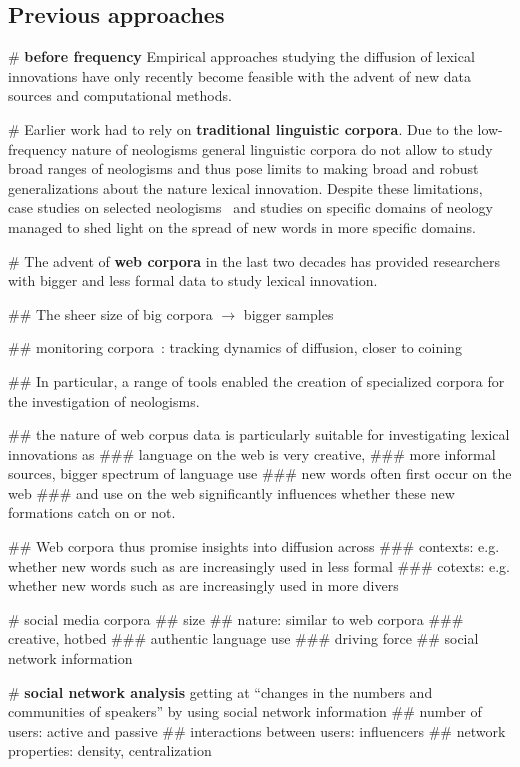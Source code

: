 \documentclass[a4paper, abstract=on]{scrartcl}
\renewcommand{\hw}[1]{\textbf{#1}}
\begin{document}
  \subsection{Previous approaches}

    \begin{easylist}[itemize]

      # \hw{before frequency} Empirical approaches studying the diffusion of lexical innovations have only recently become feasible with the advent of new data sources and computational methods.

      # Earlier work had to rely on \hw{traditional linguistic corpora}. Due to the low-frequency nature of neologisms general linguistic corpora do not allow to study broad ranges of neologisms and thus pose limits to making broad and robust generalizations about the nature lexical innovation. Despite these limitations, case studies on selected neologisms~\parencite{Hohenhaus2006} and studies on specific domains of neology~\parencite{Elsen2004} managed to shed light on the spread of new words in more specific domains.

      # The advent of \hw{web corpora} in the last two decades has provided researchers with bigger and less formal data to study lexical innovation.

        ## The sheer size of big corpora $\rightarrow$ bigger samples

        ## monitoring corpora~\parencite{Davies2013}: tracking dynamics of diffusion, closer to coining

        ## In particular, a range of tools enabled the creation of specialized corpora for the investigation of neologisms.~\parencite{Renouf2006,Kerremans2012,Lemnitzer,Gerard2017,Cartier2017}

        ## the nature of web corpus data is particularly suitable for investigating lexical innovations as
          ### language on the web is very creative,
          ### more informal sources, bigger spectrum of language use
          ### new words often first occur on the web
          ### and use on the web significantly influences whether these new formations catch on or not.

        ## Web corpora thus promise insights into diffusion across
          ### contexts: e.g. whether new words such as  are increasingly used in less formal
          ### cotexts: e.g. whether new words such as \ol{} are increasingly used in more divers

      # social media corpora \cite{Grieve2016,Eisenstein2014}
        ## size
        ## nature: similar to web corpora
          ### creative, hotbed
          ### authentic language use
          ### driving force
        ## social network information

      # \hw{social network analysis} getting at \enquote{changes in the numbers and communities of speakers} by using social network information
        ## number of users: active and passive
        ## interactions between users: influencers
        ## network properties: density, centralization

    \end{easylist}
\end{document}
